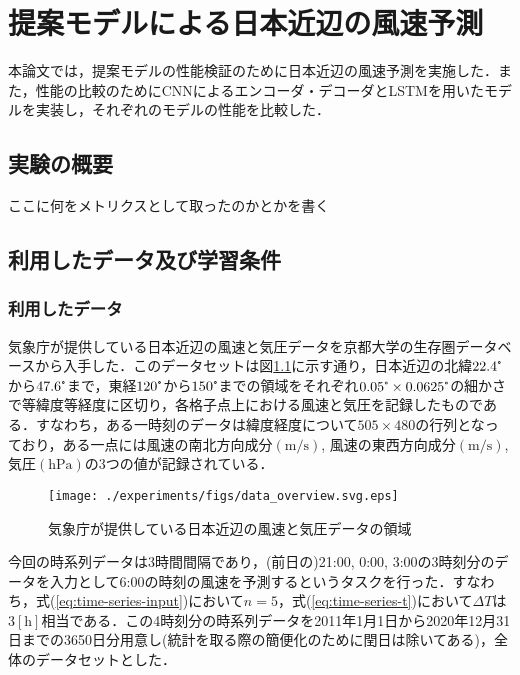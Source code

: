 \chapter{提案モデルによる日本近辺の風速予測\label{chap:experiments}}
本論文では，提案モデルの性能検証のために日本近辺の風速予測を実施した．また，性能の比較のためにCNNによるエンコーダ・デコーダとLSTMを用いたモデルを実装し，それぞれのモデルの性能を比較した．

\section{実験の概要 \label{section:exp-overview}}
ここに何をメトリクスとして取ったのかとかを書く

\section{利用したデータ及び学習条件 \label{section:exp-data-and-condition}}
\subsection{利用したデータ \label{subsection:exp-data}}
気象庁が提供している日本近辺の風速と気圧データを京都大学の生存圏データベース\cite{Seizonken2004}から入手した．このデータセットは図\ref{fig:exp-data-overview}に示す通り，日本近辺の北緯$22.4\tcdegree$から$47.6\tcdegree$まで，東経$120\tcdegree$から$150\tcdegree$までの領域をそれぞれ$0.05\tcdegree \times 0.0625\tcdegree$の細かさで等緯度等経度に区切り，各格子点上における風速と気圧を記録したものである\cite{JMBSC2022}．すなわち，ある一時刻のデータは緯度経度について$505 \times 480$の行列となっており，ある一点には風速の南北方向成分$(\mathrm{m/s})$, 風速の東西方向成分$(\mathrm{m/s})$, 気圧$(\mathrm{hPa})$の3つの値が記録されている．
\begin{figure}[btp]
  \centering
  \texttt{[image: ./experiments/figs/data\_overview.svg.eps]}
  \caption{気象庁が提供している日本近辺の風速と気圧データの領域}
  \label{fig:exp-data-overview}
\end{figure}

今回の時系列データは3時間間隔であり，(前日の)21:00, 0:00, 3:00の3時刻分のデータを入力として6:00の時刻の風速を予測するというタスクを行った．すなわち，式(\ref{eq:time-series-input})において$n=5$，式(\ref{eq:time-series-t})において$\Delta T$は$3[\mathrm{h}]$相当である．この4時刻分の時系列データを2011年1月1日から2020年12月31日までの3650日分用意し(統計を取る際の簡便化のために閏日は除いてある)，全体のデータセットとした．

